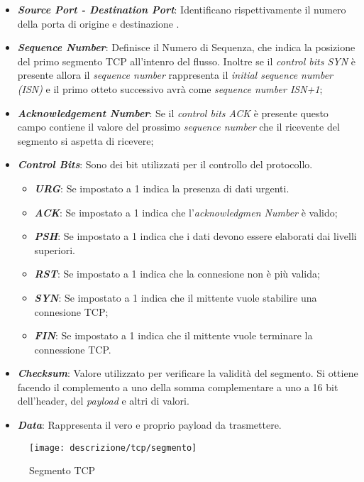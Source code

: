 \begin{itemize}
\item \textit{\textbf{Source Port - Destination Port}}: Identificano rispettivamente il numero della porta di origine e destinazione .
\item \textit{\textbf{Sequence Number}}: Definisce il Numero di Sequenza, che indica la posizione del primo segmento TCP all'intenro del flusso. Inoltre se il \emph{control bits SYN \glsfirstoccur} è presente allora il \emph{sequence number} rappresenta il \emph{initial sequence number (ISN)} e il primo otteto successivo avrà come \emph{sequence number ISN+1};
\item \textit{\textbf{Acknowledgement Number}}: Se il \emph{control bits ACK \glsfirstoccur} è presente questo campo contiene il valore del prossimo \emph{sequence number} che il ricevente del segmento si aspetta di ricevere;
\item \textit{\textbf{Control Bits}}: Sono dei bit utilizzati per il controllo del protocollo. 
\begin{itemize}
    \item \textit{\textbf{URG}}: Se impostato a 1 indica la presenza di dati urgenti.
    \item \textit{\textbf{ACK}}: Se impostato a 1 indica che l'\emph{acknowledgmen Number} è valido;
    \item \textit{\textbf{PSH}}: Se impostato a 1 indica che i dati devono essere elaborati dai livelli superiori.
    \item \textit{\textbf{RST}}: Se impostato a 1 indica che la connesione non è più valida;
    \item \textit{\textbf{SYN}}: Se impostato a 1 indica che il mittente vuole stabilire una connesione TCP;
    \item \textit{\textbf{FIN}}: Se impostato a 1 indica che il mittente vuole terminare la connessione TCP.
\end{itemize}

\item \textit{\textbf{Checksum}}: Valore utilizzato per verificare la validità del segmento. Si ottiene facendo il complemento a uno della somma complementare a uno a 16 bit dell'header, del \emph{payload} e altri di valori.
\item \textit{\textbf{Data}}: Rappresenta il vero e proprio payload da trasmettere.
\end{itemize}

\begin{figure}[!h]
\centering
\texttt{[image: descrizione/tcp/segmento]}
\caption{Segmento TCP}
\label{fig}
\end{figure}

